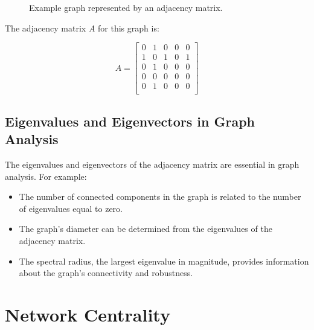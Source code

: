 \documentclass{article}
\begin{document}
\begin{figure}[ht]
\centering
{}
\caption{Example graph represented by an adjacency matrix.}
\end{figure}

The adjacency matrix $A$ for this graph is:

\[ A = \begin{bmatrix}
0 & 1 & 0 & 0 & 0 \\
1 & 0 & 1 & 0 & 1 \\
0 & 1 & 0 & 0 & 0 \\
0 & 0 & 0 & 0 & 0 \\
0 & 1 & 0 & 0 & 0 \\
\end{bmatrix} \]

\subsection{Eigenvalues and Eigenvectors in Graph Analysis}

The eigenvalues and eigenvectors of the adjacency matrix are essential in graph analysis. For example:

\begin{itemize}
\item The number of connected components in the graph is related to the number of eigenvalues equal to zero.
\item The graph's diameter can be determined from the eigenvalues of the adjacency matrix.
\item The spectral radius, the largest eigenvalue in magnitude, provides information about the graph's connectivity and robustness.
\end{itemize}

\section{Network Centrality}
\end{document}
